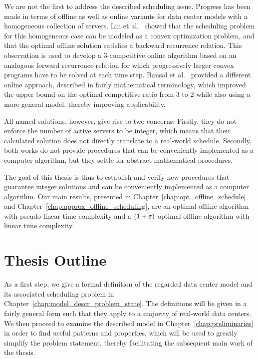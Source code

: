 We are not the first to address the described scheduling issue. Progress has been made in terms of offline as well as online variants for data center models with a homogeneous collection of servers. Lin et al.~\parencite{dyn-right-sizing} showed that the scheduling problem for this homogeneous case can be modeled as a convex optimization problem, and that the optimal offline solution satisfies a backward recurrence relation. This observation is used to develop a 3-competitive online algorithm based on an analogous forward recurrence relation for which progressively larger convex programs have to be solved at each time step. Bansal et al.~\parencite{bansal-soco} provided a different online approach, described in fairly mathematical terminology, which improved the upper bound on the optimal competitive ratio from 3 to 2 while also using a more general model, thereby improving applicability. 

All named solutions, however, give rise to two concerns: Firstly, they do not enforce the number of active servers to be integer, which means that their calculated solution does not directly translate to a real-world schedule. Secondly, both works do not provide procedures that can be conveniently implemented as a computer algorithm, but they settle for abstract mathematical procedures.

The goal of this thesis is thus to establish and verify new procedures that guarantee integer solutions and can be conveniently implemented as a computer algorithm. Our main results, presented in Chapter~\ref{chap:opt_offline_schedule} and Chapter~\ref{chap:approx_offline_scheduling}, are an optimal offline algorithm with pseudo-linear time complexity and a $(1+\boldsymbol\varepsilon)$-optimal offline algorithm with linear time complexity.

\section{Thesis Outline}
As a first step, we give a formal definition of the regarded data center model and its associated scheduling problem in Chapter~\ref{chap:model_descr_problem_state}. The definitions will be given in a fairly general form such that they apply to a majority of real-world data centers. We then proceed to examine the described model in Chapter~\ref{chap:preliminaries} in order to find useful patterns and properties, which will be used to greatly simplify the problem statement, thereby facilitating the subsequent main work of the thesis.

